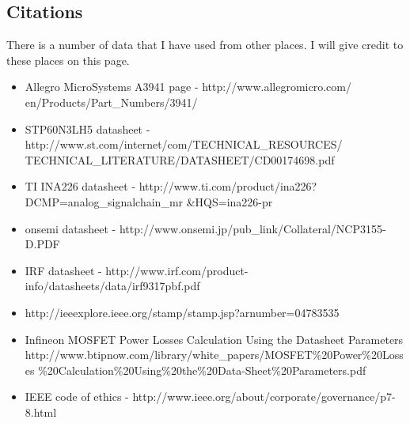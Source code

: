 \documentclass[12pt]{article}
\begin{document}
\subsection{Citations}
There is a number of data that I have used from other places. I will give credit to these places on this page.
\begin{itemize}
\item Allegro MicroSystems A3941 page - http://www.allegromicro.com/ en/Products/Part\_Numbers/3941/
\item STP60N3LH5 datasheet - http://www.st.com/internet/com/TECHNICAL\_RESOURCES/ TECHNICAL\_LITERATURE/DATASHEET/CD00174698.pdf
\item TI INA226 datasheet - http://www.ti.com/product/ina226?DCMP=analog\_signalchain\_mr \&HQS=ina226-pr
\item onsemi datasheet - http://www.onsemi.jp/pub\_link/Collateral/NCP3155-D.PDF
\item IRF datasheet - http://www.irf.com/product-info/datasheets/data/irf9317pbf.pdf
\item http://ieeexplore.ieee.org/stamp/stamp.jsp?arnumber=04783535
\item Infineon MOSFET Power Losses Calculation Using the Datasheet Parameters http://www.btipnow.com/library/white\_papers/MOSFET\%20Power\%20Losses \%20Calculation\%20Using\%20the\%20Data-Sheet\%20Parameters.pdf
\item IEEE code of ethics - http://www.ieee.org/about/corporate/governance/p7-8.html

\end{itemize}

 
\end{document}

